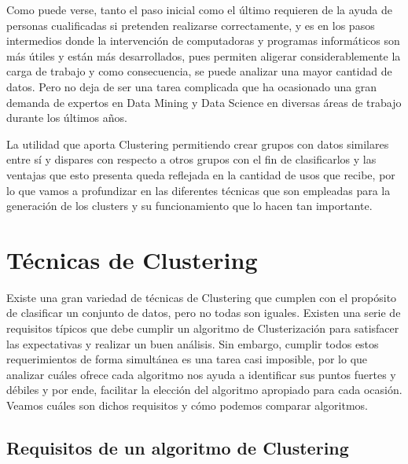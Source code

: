 \documentclass[3p,twocolumn]{elsarticle}
\begin{document}
Como puede verse, tanto el paso inicial como el último requieren de la ayuda de personas cualificadas si pretenden realizarse correctamente, y es en los pasos intermedios donde la intervención de computadoras y programas informáticos son más útiles y están más desarrollados, pues permiten aligerar considerablemente la carga de trabajo y como consecuencia, se puede analizar una mayor cantidad de datos. Pero no deja de ser una tarea complicada que ha ocasionado una gran demanda de expertos en Data Mining y Data Science en diversas áreas de trabajo durante los últimos años.

La utilidad que aporta Clustering permitiendo crear grupos con datos similares entre sí y dispares con respecto a otros grupos con el fin de clasificarlos y las ventajas que esto presenta queda reflejada en la cantidad de usos que recibe, por lo que vamos a profundizar en las diferentes técnicas que son empleadas para la generación de los clusters y su funcionamiento que lo hacen tan importante.



\section{Técnicas de Clustering} \label{sec:Técnicas de Clustering}

Existe una gran variedad de técnicas de Clustering que cumplen con el propósito de clasificar un conjunto de datos, pero no todas son iguales. Existen una serie de requisitos típicos que debe cumplir un algoritmo de Clusterización para satisfacer las expectativas y realizar un buen análisis. Sin embargo, cumplir todos estos requerimientos de forma simultánea es una tarea casi imposible, por lo que analizar cuáles ofrece cada algoritmo nos ayuda a identificar sus puntos fuertes y débiles y por ende, facilitar la elección del algoritmo apropiado para cada ocasión. Veamos cuáles son dichos requisitos y cómo podemos comparar algoritmos.

\subsection{\textbf{Requisitos de un algoritmo de Clustering}} \label{subsec:Requisitos de un algoritmo de Clustering}
\end{document}
